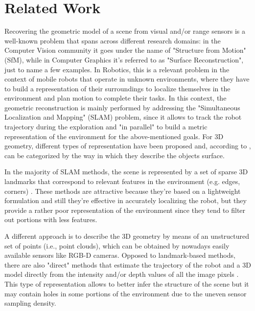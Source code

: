 \documentclass[]{article}
\begin{document}
\section{Related Work}
Recovering the geometric model of a scene from visual and/or range sensors is a well-known problem that spans across different research domains: in the Computer Vision community it goes under the name of "Structure from Motion" (SfM), while in Computer Graphics it's referred to as "Surface Reconstruction", just to name a few examples. In Robotics, this is a relevant problem in the context of mobile robots that operate in unknown environments, where they have to build a representation of their surroundings to localize themselves in the environment and plan motion to complete their tasks. In this context, the geometric reconstruction is mainly performed by addressing the "Simultaneous Localization and Mapping" (SLAM) problem, since it allows to track the robot trajectory during the exploration and "in parallel" to build a metric representation of the environment for the above-mentioned goals. For 3D geometry, different types of representation have been proposed and, according to \cite{cadena2016past}, can be categorized by the way in which they describe the objects surface.

In the majority of SLAM methods, the scene is represented by a set of sparse 3D landmarks that correspond to relevant features in the environment (e.g. edges, corners) \cite{mur2015orb,klein2007parallel}. These methods are attractive because they're based on a lightweight formulation and still they're effective in accurately localizing the robot, but they provide a rather poor representation of the environment since they tend to filter out portions with less features.

A different approach is to describe the 3D geometry by means of an unstructured set of points (i.e., point clouds), which can be obtained by nowadays easily available sensors like RGB-D cameras. Opposed to landmark-based methods, there are also "direct" methods that estimate the trajectory of the robot and a 3D model directly from the intensity and/or depth values of all the image pixels \cite{newcombe2011dtam,kerl13iros}. This type of representation allows to better infer the structure of the scene but it may contain holes in some portions of the environment due to the uneven sensor sampling density.
\end{document}
